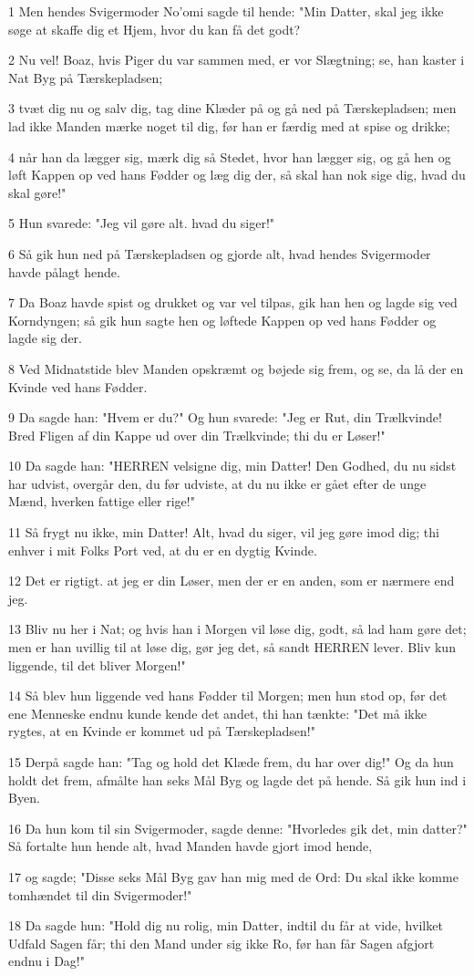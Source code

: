 \par 1 Men hendes Svigermoder No'omi sagde til hende: "Min Datter, skal jeg ikke søge at skaffe dig et Hjem, hvor du kan få det godt?
\par 2 Nu vel! Boaz, hvis Piger du var sammen med, er vor Slægtning; se, han kaster i Nat Byg på Tærskepladsen;
\par 3 tvæt dig nu og salv dig, tag dine Klæder på og gå ned på Tærskepladsen; men lad ikke Manden mærke noget til dig, før han er færdig med at spise og drikke;
\par 4 når han da lægger sig, mærk dig så Stedet, hvor han lægger sig, og gå hen og løft Kappen op ved hans Fødder og læg dig der, så skal han nok sige dig, hvad du skal gøre!"
\par 5 Hun svarede: "Jeg vil gøre alt. hvad du siger!"
\par 6 Så gik hun ned på Tærskepladsen og gjorde alt, hvad hendes Svigermoder havde pålagt hende.
\par 7 Da Boaz havde spist og drukket og var vel tilpas, gik han hen og lagde sig ved Korndyngen; så gik hun sagte hen og løftede Kappen op ved hans Fødder og lagde sig der.
\par 8 Ved Midnatstide blev Manden opskræmt og bøjede sig frem, og se, da lå der en Kvinde ved hans Fødder.
\par 9 Da sagde han: "Hvem er du?" Og hun svarede: "Jeg er Rut, din Trælkvinde! Bred Fligen af din Kappe ud over din Trælkvinde; thi du er Løser!"
\par 10 Da sagde han: "HERREN velsigne dig, min Datter! Den Godhed, du nu sidst har udvist, overgår den, du før udviste, at du nu ikke er gået efter de unge Mænd, hverken fattige eller rige!"
\par 11 Så frygt nu ikke, min Datter! Alt, hvad du siger, vil jeg gøre imod dig; thi enhver i mit Folks Port ved, at du er en dygtig Kvinde.
\par 12 Det er rigtigt. at jeg er din Løser, men der er en anden, som er nærmere end jeg.
\par 13 Bliv nu her i Nat; og hvis han i Morgen vil løse dig, godt, så lad ham gøre det; men er han uvillig til at løse dig, gør jeg det, så sandt HERREN lever. Bliv kun liggende, til det bliver Morgen!"
\par 14 Så blev hun liggende ved hans Fødder til Morgen; men hun stod op, før det ene Menneske endnu kunde kende det andet, thi han tænkte: "Det må ikke rygtes, at en Kvinde er kommet ud på Tærskepladsen!"
\par 15 Derpå sagde han: "Tag og hold det Klæde frem, du har over dig!" Og da hun holdt det frem, afmålte han seks Mål Byg og lagde det på hende. Så gik hun ind i Byen.
\par 16 Da hun kom til sin Svigermoder, sagde denne: "Hvorledes gik det, min datter?" Så fortalte hun hende alt, hvad Manden havde gjort imod hende,
\par 17 og sagde; "Disse seks Mål Byg gav han mig med de Ord: Du skal ikke komme tomhændet til din Svigermoder!"
\par 18 Da sagde hun: "Hold dig nu rolig, min Datter, indtil du får at vide, hvilket Udfald Sagen får; thi den Mand under sig ikke Ro, før han får Sagen afgjort endnu i Dag!"

